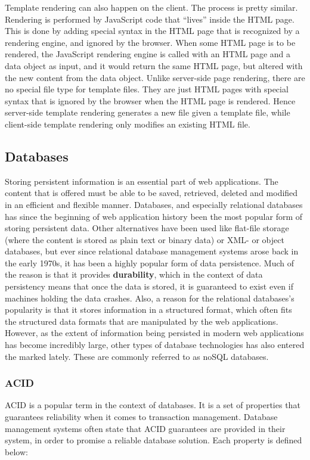 Template rendering can also happen on the client. The process is pretty similar. Rendering is  performed by JavaScript code that ``lives'' inside the HTML page. This is done by adding special syntax in the HTML page that is recognized by a rendering engine, and ignored by the browser. When some HTML page is to be rendered, the JavaScript rendering engine is called with an HTML page and a data object as input, and it would return the same HTML page, but altered with the new content from the data object. Unlike server-side page rendering, there are no special file type for template files. They are just HTML pages with special syntax that is ignored by the browser when the HTML page is rendered. Hence server-side template rendering generates a new file given a template file, while client-side template rendering only modifies an existing HTML file. 

\subsection{Databases}
Storing persistent information is an essential part of web applications. The content that is offered must be able to be saved, retrieved, deleted and modified in an efficient and flexible manner. Databases, and especially relational databases has since the beginning of web application history been the most popular form of storing persistent data.\cite{engineering} Other alternatives have been used like flat-file storage (where the content is stored as plain text or binary data) or XML- or object databases, but ever since relational database management systems arose back in the early 1970s, it has been a highly popular form of data persistence. Much of the reason is that it provides \textbf{durability}, which in the context of data persistency means that once the data is stored, it is guaranteed to exist even if machines holding the data crashes. Also, a reason for the relational databases's popularity is that it stores information in a structured format, which often fits the structured data formats that are manipulated by the web applications. However, as the extent of information being persisted in modern web applications has become incredibly large, other types of database technologies has also entered the marked lately. These are commonly referred to as noSQL databases.

\subsubsection{ACID}
ACID is a popular term in the context of databases. It is a set of properties that guarantees reliability when it comes to transaction management. Database management systems often state that ACID guarantees are provided in their system, in order to promise a reliable database solution. Each property is defined below:
